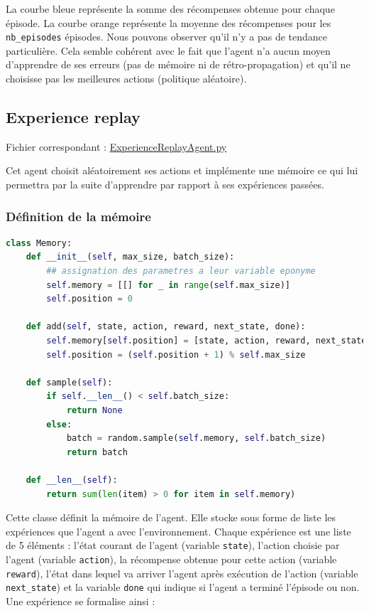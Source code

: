 \documentclass[10pt,a4paper]{article}
\begin{document}
La courbe bleue représente la somme des récompenses obtenue pour chaque épisode. La courbe orange représente la moyenne des récompenses pour les \lstinline{nb_episodes} épisodes. Nous pouvons observer qu'il n'y a pas de tendance particulière. Cela semble cohérent avec le fait que l'agent n'a aucun moyen d'apprendre de ses erreurs (pas de mémoire ni de rétro-propagation) et qu'il ne choisisse pas les meilleures actions (politique aléatoire). 

\subsection{Experience replay}

Fichier correspondant : \href{https://github.com/NellyBarret/IA5-TP-APR/blob/master/ExperienceReplayAgent.py}{ExperienceReplayAgent.py}

Cet agent choisit aléatoirement ses actions et implémente une mémoire ce qui lui permettra par la suite d'apprendre par rapport à ses expériences passées.

\subsubsection{Définition de la mémoire}

\begin{lstlisting}[language=Python, caption=Implémentation de la mémoire d'un agent]
class Memory:
    def __init__(self, max_size, batch_size):
        ## assignation des parametres a leur variable eponyme
        self.memory = [[] for _ in range(self.max_size)]
        self.position = 0

    def add(self, state, action, reward, next_state, done):
        self.memory[self.position] = [state, action, reward, next_state, done]
        self.position = (self.position + 1) % self.max_size

    def sample(self):
        if self.__len__() < self.batch_size:
            return None
        else:
            batch = random.sample(self.memory, self.batch_size)
            return batch

    def __len__(self):
        return sum(len(item) > 0 for item in self.memory)
\end{lstlisting}

Cette classe définit la mémoire de l'agent. Elle stocke sous forme de liste les expériences que l'agent a avec l'environnement. Chaque expérience est une liste de 5 éléments : l'état courant de l'agent (variable \lstinline{state}), l'action choisie par l'agent (variable \lstinline{action}), la récompense obtenue pour cette action (variable \lstinline{reward}), l'état dans lequel va arriver l'agent après exécution de l'action (variable \lstinline{next_state}) et la variable \lstinline{done} qui indique si l'agent a terminé l'épisode ou non. Une expérience se formalise ainsi :
\end{document}
